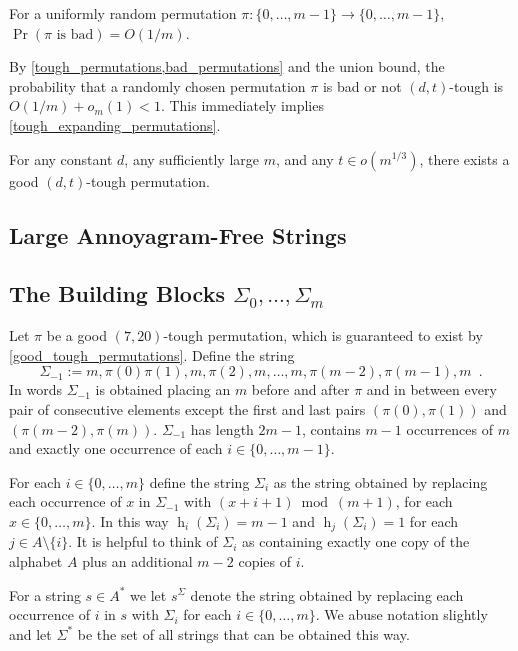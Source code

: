 \documentclass[kpfonts]{patmorin}
\DeclareMathOperator{\hist}{h}
\begin{document}
\begin{lem}\label{bad_permutations}
    For a uniformly random permutation $\pi:\{0,\ldots,m-1\}\to\{0,\ldots,m-1\}$, $\Pr(\mbox{$\pi$ is bad}) = O(1/m)$.
\end{lem}

By \cref{tough_permutations,bad_permutations} and the union bound, the probability that a randomly chosen permutation $\pi$ is bad or not $(d,t)$-tough is $O(1/m)+o_m(1) < 1$.  This immediately implies \cref{tough_expanding_permutations}.
\begin{cor}\label{good_tough_permutations}
    For any constant $d$, any sufficiently large $m$, and any $t\in o(m^{1/3})$, there exists a good $(d,t)$-tough permutation.
\end{cor}

\subsection{Large Annoyagram-Free Strings}


\subsection{The Building Blocks $\Sigma_0,\ldots,\Sigma_m$}
Let $\pi$ be a good $(7,20)$-tough permutation, which is guaranteed to exist by \cref{good_tough_permutations}.
Define the string
\[
    \Sigma_{-1} := m,\pi(0)\pi(1),m,\pi(2),m,\ldots,m,\pi(m-2),\pi(m-1),m \enspace .
\]
In words $\Sigma_{-1}$ is obtained placing an $m$ before and after $\pi$ and in between every pair of consecutive elements except the first and last pairs $(\pi(0),\pi(1))$ and $(\pi(m-2),\pi(m))$.  $\Sigma_{-1}$ has length $2m-1$, contains $m-1$ occurrences of $m$ and exactly one occurrence of each $i\in\{0,\ldots,m-1\}$.

For each $i\in\{0,\ldots,m\}$ define the string $\Sigma_i$ as the string obtained by replacing each occurrence of $x$ in $\Sigma_{-1}$ with $(x+i+1)\bmod (m+1)$, for each $x\in\{0,\ldots,m\}$.  In this way $\hist_i(\Sigma_i) = m-1$ and $\hist_j(\Sigma_i)=1$ for each $j\in A\setminus\{i\}$. It is helpful to think of $\Sigma_i$ as containing exactly one copy of the alphabet $A$ plus an additional $m-2$ copies of $i$.


For a string $s\in A^*$ we let $s^\Sigma$ denote the string obtained by replacing each occurrence of $i$ in $s$ with $\Sigma_i$ for each $i\in\{0,\ldots,m\}$. We abuse notation slightly and let $\Sigma^*$ be the set of all strings that can be obtained this way.
\end{document}
